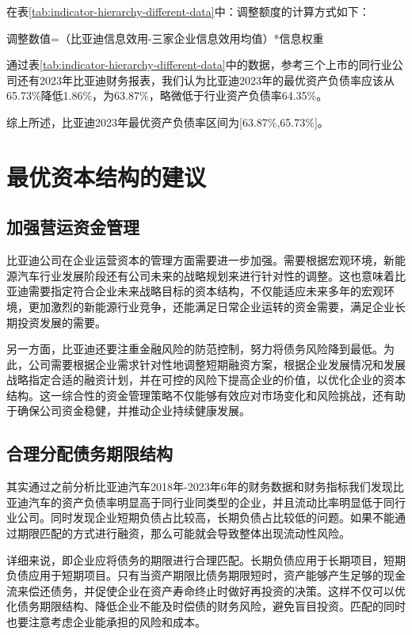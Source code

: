 在表\eqref{tab:indicator-hierarchy-different-data}中：调整额度的计算方式如下：

调整数值=（比亚迪信息效用-三家企业信息效用均值）*信息权重

通过表\eqref{tab:indicator-hierarchy-different-data}中的数据，参考三个上市的同行业公司还有2023年比亚迪财务报表，我们认为比亚迪2023年的最优资产负债率应该从65.73\%降低1.86\%，为63.87\%，略微低于行业资产负债率64.35\%。

综上所述，比亚迪2023年最优资产负债率区间为[63.87\%,65.73\%]。
\section{最优资本结构的建议}
\subsection{加强营运资金管理}
比亚迪公司在企业运营资本的管理方面需要进一步加强。需要根据宏观环境，新能源汽车行业发展阶段还有公司未来的战略规划来进行针对性的调整。这也意味着比亚迪需要指定符合企业未来战略目标的资本结构，不仅能适应未来多年的宏观环境，更加激烈的新能源行业竞争，还能满足日常企业运转的资金需要，满足企业长期投资发展的需要。  

另一方面，比亚迪还要注重金融风险的防范控制，努力将债务风险降到最低。为此，公司需要根据企业需求针对性地调整短期融资方案，根据企业发展情况和发展战略指定合适的融资计划，并在可控的风险下提高企业的价值，以优化企业的资本结构。这一综合性的资金管理策略不仅能够有效应对市场变化和风险挑战，还有助于确保公司资金稳健，并推动企业持续健康发展。
\subsection{合理分配债务期限结构}
其实通过之前分析比亚迪汽车2018年-2023年6年的财务数据和财务指标我们发现比亚迪汽车的资产负债率明显高于同行业同类型的企业，并且流动比率明显低于同行业公司。同时发现企业短期负债占比较高，长期负债占比较低的问题。如果不能通过期限匹配的方式进行融资，那么可能就会导致整体出现流动性风险。

详细来说，即企业应将债务的期限进行合理匹配。长期负债应用于长期项目，短期负债应用于短期项目。只有当资产期限比债务期限短时，资产能够产生足够的现金流来偿还债务，并促使企业在资产寿命终止时做好再投资的决策。这样不仅可以优化债务期限结构、降低企业不能及时偿债的财务风险，避免盲目投资。匹配的同时也要注意考虑企业能承担的风险和成本。
